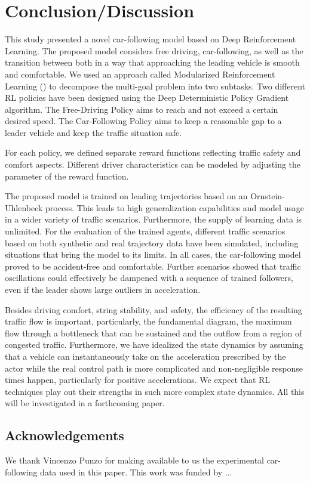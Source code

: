 \documentclass[review]{elsarticle}
\providecommand{\martin}[1]{#1}                  %
\providecommand{\martinc}[1]{}                  %
\providecommand{\3}{{\ss}}
\begin{document}
	\section{Conclusion/Discussion}
	\label{sec:conclusion}
	This study presented a novel car-following model based on
	Deep Reinforcement Learning. \martinc{Die Conclusion wird
		bisweilen separat gelesen, so besser (wie immer im Abstract) keine
		Abk\"urzungen verwenden, au\3er die allergebr\"auchlichsten} The
	proposed model considers free driving, car-following, as well as the
	transition between both in a way that approaching the leading vehicle
	is smooth and comfortable. We used an approach called Modularized
	Reinforcement Learning (\cite{MRL}) to decompose the multi-goal
	problem into two subtasks. Two different RL policies have been
	designed using the Deep Deterministic Policy Gradient algorithm. The
	Free-Driving Policy aims to reach and not exceed a certain
	desired speed. The Car-Following Policy aims to keep a reasonable gap
	to a leader vehicle and keep the traffic situation safe. 
	
	For each policy, we defined separate reward functions reflecting traffic safety and comfort aspects. 
	Different driver characteristics can be modeled by adjusting the parameter of the reward function.
	
	The proposed model is trained on leading trajectories based on an
	Ornstein-Uhlenbeck process. This leads to high generalization capabilities and model usage in a wider variety of traffic scenarios. Furthermore, the
	supply of learning data is unlimited.
	For the evaluation of the trained agents, different traffic scenarios
	based on both synthetic and
	real trajectory data have been simulated, including situations that
	bring the model to its limits. 
	In all cases, the car-following model proved to be accident-free and
	comfortable. Further scenarios showed that traffic oscillations could
	effectively be dampened with a sequence of trained followers, even if
	the leader shows large outliers in acceleration.
	
	Besides driving comfort, string stability, and safety,
	the efficiency of the resulting traffic flow is important,
	particularly, the fundamental diagram, the maximum flow through a
	bottleneck that can be 
	sustained and the outflow from a region of congested
	traffic. Furthermore, we have idealized the state dynamics by
	assuming that a vehicle can instantaneously take on the acceleration
	prescribed by the actor while the real control path is more
	complicated and non-negligible response times happen, particularly
	for positive accelerations. We expect that RL techniques play out
	their strengths in such more complex state dynamics. All this  will
	be investigated in a forthcoming paper.
	
	\martin{
		\subsection*{Acknowledgements}
		We thank Vincenzo Punzo for making available to us the experimental
		car-following data used in this paper. This work was funded by ...}
	\martinc{Ostap: DFG oder andere funds nennen?}
	
	
	
	
	
	
	
\end{document}
